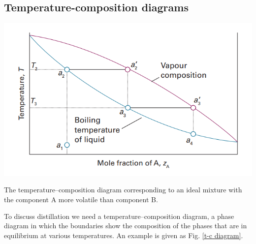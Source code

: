 \subsection{Temperature-composition diagrams}
\begin{marginfigure}
    \setlength{\abovecaptionskip}{0.5pt}
    \centering
    \includegraphics[width=\textwidth]{fig/f4.png}
    \caption{The temperature–composition diagram corresponding to an ideal mixture with the component A more volatile than component B. }
    \label{t-c diagram}
\end{marginfigure}
To discuss distillation we need a temperature–composition diagram, a phase diagram in which the boundaries show the composition of the phases that are in equilibrium at various temperatures. An example is given as Fig. \ref{t-c diagram}.
